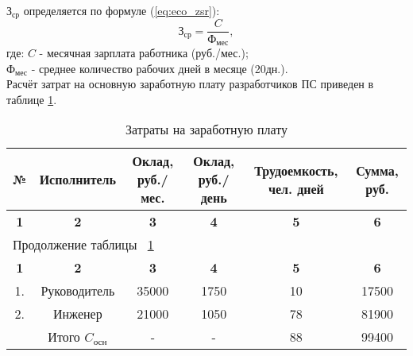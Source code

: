 ${\mbox{З}_{\mbox{ср}}}$ определяется по формуле (\ref{eq:eco_zsr}):
\begin{equation}
\mbox{З}_{\mbox{ср}} = \frac{C}{\mbox{Ф}_{\mbox{мес}}},
\label{eq:eco_zsr}
\end{equation}
где:	${C}$ - месячная зарплата работника (руб./мес.); \\
	${\mbox{Ф}_{\mbox{мес}}}$ - среднее количество рабочих дней в месяце (20дн.). \\

Расчёт затрат на основную заработную плату разработчиков ПС приведен в таблице \ref{tab:eco_zarplata}.

\begin{center}
\begin{longtable}{|c|c|c|c|c|c|}
\caption{Затраты на заработную плату} \label{tab:eco_zarplata} \\ \hline
\multicolumn{1}{|c|}{\textbf{№}} & \multicolumn{1}{c|}{\textbf{Исполнитель}} & 
\multicolumn{1}{p{2.5cm}|}{\textbf{Оклад, руб./мес.}} &   \multicolumn{1}{p{2.5cm}|}{\textbf{Оклад, руб./день}} & 
\multicolumn{1}{p{3.5cm}|}{\textbf{Трудоемкость, чел. дней}} & \multicolumn{1}{p{2cm}|}{\textbf{Сумма, руб.}} \\ \hline

\multicolumn{1}{|c|}{\textbf{1}} &   \multicolumn{1}{c|}{\textbf{2}} & 
\multicolumn{1}{c|}{\textbf{3}} &   \multicolumn{1}{c|}{\textbf{4}} & 
\multicolumn{1}{c|}{\textbf{5}} & \multicolumn{1}{c|}{\textbf{6}} \\ \hline
\endfirsthead

\multicolumn{6}{|l|}{{Продолжение таблицы ~\ref{tab:eco_zarplata}}} \\ %
\hline
\multicolumn{1}{|c|}{\textbf{1}} &   \multicolumn{1}{c|}{\textbf{2}} & 
\multicolumn{1}{c|}{\textbf{3}} &   \multicolumn{1}{c|}{\textbf{4}} & 
\multicolumn{1}{c|}{\textbf{5}} & \multicolumn{1}{c|}{\textbf{6}} \\ \hline
\endhead

\endfoot

\hline
\endlastfoot

1. & Руководитель & 35000 & 1750 & 10 & 17500 \\ \hline
2. & Инженер & 21000 & 1050 & 78 & 81900\\ \hline
 & Итого ${C_{\mbox{осн}}}$ & - & - & 88 & 99400 \\

\hline

\end{longtable}
\end{center}

